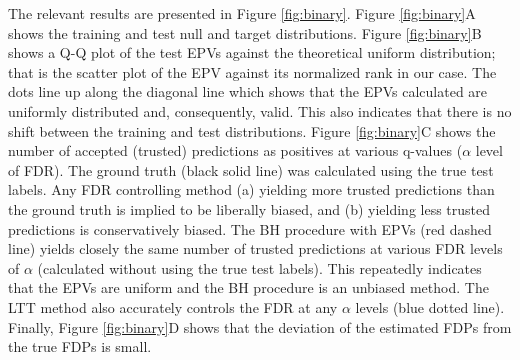 \documentclass{article}
\begin{document}
The relevant results are presented in Figure \ref{fig:binary}. Figure \ref{fig:binary}A shows the training and test null and target distributions. %
Figure \ref{fig:binary}B shows a Q-Q plot of the test EPVs against the theoretical uniform distribution; that is the scatter plot of the EPV against its normalized rank in our case. The dots line up along the diagonal line which shows that the EPVs calculated are uniformly distributed and, consequently, valid. This also indicates that there is no shift between the training and test distributions. %
Figure \ref{fig:binary}C shows the number of accepted (trusted) predictions as positives at various q-values ($\alpha$ level of FDR). The ground truth (black solid line) was calculated using the true test labels. Any FDR controlling method (a) yielding more trusted predictions than the ground truth is implied to be liberally biased, and (b) yielding less trusted predictions is conservatively biased. The BH procedure with EPVs (red dashed line) yields closely the same number of trusted predictions at various FDR levels of $\alpha$ (calculated without using the true test labels). This repeatedly indicates that the EPVs are uniform and the  BH procedure is an unbiased method. The LTT method also accurately controls the FDR at any $\alpha$ levels (blue dotted line). Finally, Figure \ref{fig:binary}D shows that the deviation of the estimated FDPs from the true FDPs is small.
\end{document}
